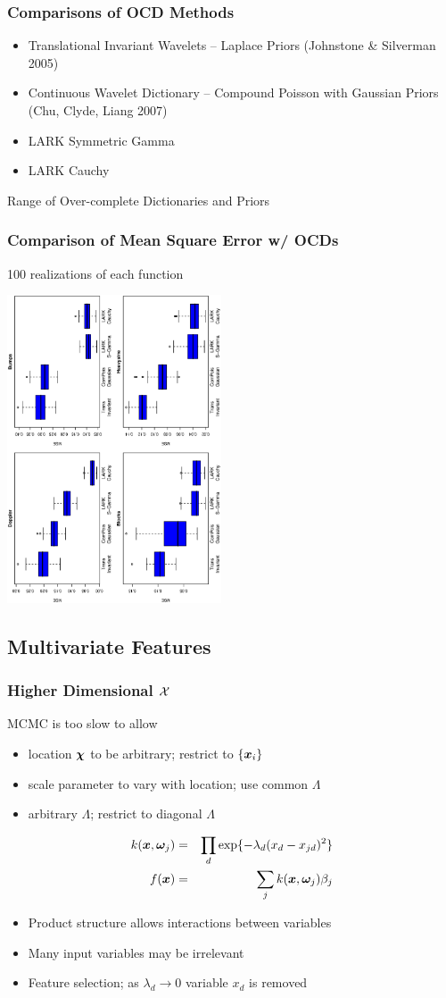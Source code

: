 \documentclass[dvips]{beamer}
\newcommand{\bs}[2]{\begin{frame} \frametitle{#1} 
{#2}
\end{frame} }
\begin{document}
\bs{Comparisons of OCD Methods} {
  \begin{itemize}
  \item Translational Invariant Wavelets -- Laplace Priors
    (Johnstone \& Silverman     2005)  
  \item Continuous Wavelet Dictionary -- Compound Poisson with
    Gaussian Priors (Chu, Clyde, Liang 2007)
  \item LARK Symmetric Gamma
  \item LARK Cauchy
  \end{itemize}
Range of Over-complete Dictionaries and Priors
}
\bs{Comparison of Mean Square Error w/ OCDs} {
100 realizations of each function

\centerline{\includegraphics[width=2.5in,angle=270]{mse.eps} }

}
\subsection{Multivariate Features} 
\bs{Higher Dimensional $\mathcal{X}$} {

MCMC is too slow to allow
\begin{itemize}
\item location $\bm \chi$ to be arbitrary; restrict to $\{\bm x_i\}$
\item scale parameter to vary with location; use common $\Lambda$
\item arbitrary $\Lambda$; restrict to diagonal $\Lambda$
\end{itemize}
\begin{eqnarray*}
k(\bm x, \bm \omega_j) & = & \prod_d \exp\{ -\lambda_d (x_d - x_{jd})^2
\} \\  
f(\bm x) & =  & \sum_j k(\bm x, \bm \omega_j) \beta_j
\end{eqnarray*}


\begin{itemize}
\item Product structure allows interactions between variables
\item Many input variables may be irrelevant
\item Feature selection; as $\lambda_d \rightarrow 0$ variable $x_d$ is removed
\end{itemize}

}
\end{document}
